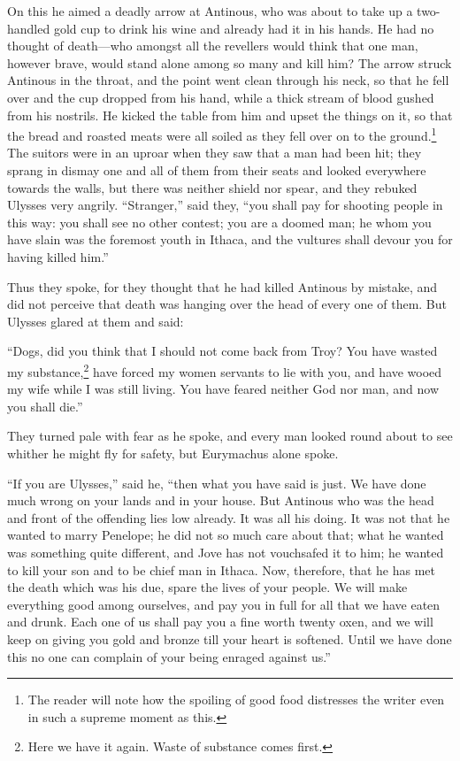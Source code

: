 On this he aimed a deadly arrow at Antinous, who was about to take up a
two-handled gold cup to drink his wine and already had it in his hands. He had
no thought of death—who amongst all the revellers would think that one man,
however brave, would stand alone among so many and kill him? The arrow struck
Antinous in the throat, and the point went clean through his neck, so that he
fell over and the cup dropped from his hand, while a thick stream of blood
gushed from his nostrils. He kicked the table from him and upset the things on
it, so that the bread and roasted meats were all soiled as they fell over on to
the ground.\footnote{The reader will note how the spoiling of good food distresses the writer
even in such a supreme moment as this.}
The suitors were in an uproar when they saw that a man had been hit; they
sprang in dismay one and all of them from their seats and looked everywhere
towards the walls, but there was neither shield nor spear, and they rebuked
Ulysses very angrily. “Stranger,” said they, “you shall pay for shooting people
in this way: you shall see no other contest; you are a doomed man; he whom you
have slain was the foremost youth in Ithaca, and the vultures shall devour you
for having killed him.”

Thus they spoke, for they thought that he had killed Antinous by mistake, and
did not perceive that death was hanging over the head of every one of them. But
Ulysses glared at them and said:

“Dogs, did you think that I should not come back from Troy? You have wasted my
substance,\footnote{Here we have it again. Waste of substance comes first.}
have forced my women servants to lie with you, and have wooed my wife while I
was still living. You have feared neither God nor man, and now you shall die.”

They turned pale with fear as he spoke, and every man looked round about to see
whither he might fly for safety, but Eurymachus alone spoke.

“If you are Ulysses,” said he, “then what you have said is just. We have done
much wrong on your lands and in your house. But Antinous who was the head and
front of the offending lies low already. It was all his doing. It was not that
he wanted to marry Penelope; he did not so much care about that; what he wanted
was something quite different, and Jove has not vouchsafed it to him; he wanted
to kill your son and to be chief man in Ithaca. Now, therefore, that he has met
the death which was his due, spare the lives of your people. We will make
everything good among ourselves, and pay you in full for all that we have eaten
and drunk. Each one of us shall pay you a fine worth twenty oxen, and we will
keep on giving you gold and bronze till your heart is softened. Until we have
done this no one can complain of your being enraged against us.”

